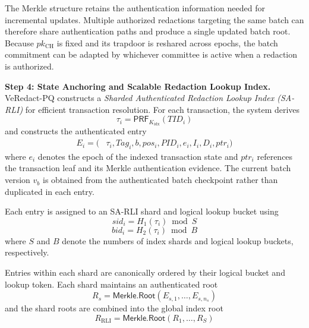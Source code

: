 \documentclass[lettersize,journal]{IEEEtran}
\begin{document}
    The Merkle structure retains the authentication
    information needed for incremental updates.
    Multiple authorized redactions targeting the
    same batch can therefore share authentication
    paths and produce a single updated batch root.
     {Because $pk_{\mathrm{CH}}$ is fixed and its trapdoor is
    reshared across epochs, the batch commitment can be adapted by whichever
    committee is active when a redaction is authorized.}
    
    \medskip
    \noindent\textbf{Step 4: State Anchoring and Scalable
    Redaction Lookup Index.}
    VeRedact-PQ constructs a \emph{Sharded
    Authenticated Redaction Lookup Index (SA-RLI)}
    for efficient transaction resolution. For each
    transaction, the system derives
    \begin{equation}
    \tau_i=
    \mathsf{PRF}_{K_{\mathrm{idx}}}(TID_i)
    \end{equation}
    and constructs the authenticated entry
    \begin{equation}
    \begin{aligned}
    E_i=\big(&\tau_i,Tag_i,b,pos_i,PID_i,e_i,I_i,D_i,ptr_i\big)
    \end{aligned}
    \end{equation}
    where $e_i$ denotes the epoch of the indexed
    transaction state and $ptr_i$ references the
    transaction leaf and its Merkle authentication
    evidence. The current batch version $v_b$ is
    obtained from the authenticated batch checkpoint
    rather than duplicated in each entry.
    
    Each entry is assigned to an SA-RLI shard
    and logical lookup bucket using
    \begin{equation}
    sid_i=H_1(\tau_i)\bmod S
    \end{equation}
    \begin{equation}
    bid_i=H_2(\tau_i)\bmod B
    \end{equation}
    where $S$ and $B$ denote the numbers of index
    shards and logical lookup buckets, respectively.
    
    Entries within each shard are canonically
    ordered by their logical bucket and lookup
    token. Each shard maintains an authenticated
    root
    \begin{equation}
    R_s=
    \mathsf{Merkle.Root}
    (E_{s,1},\ldots,E_{s,n_s})
    \end{equation}
    and the shard roots are combined into the
    global index root
    \begin{equation}
    R_{\mathrm{RLI}}=
    \mathsf{Merkle.Root}(R_1,\ldots,R_S)
    \end{equation}
    
\end{document}

